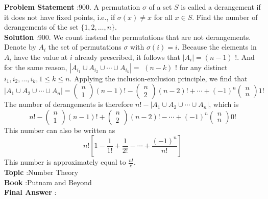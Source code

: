 \documentclass[10pt]{article}
\begin{document}
\textbf{Problem Statement} :900. A permutation $\sigma$ of a set $S$ is called a derangement if it does not have fixed points, i.e., if $\sigma(x) \neq x$ for all $x \in S$. Find the number of derangements of the set $\{1,2, \ldots, n\}$.\\
\textbf{Solution} :900. We count instead the permutations that are not derangements. Denote by $A_{i}$ the set of permutations $\sigma$ with $\sigma(i)=i$. Because the elements in $A_{i}$ have the value at $i$ already prescribed, it follows that $\left|A_{i}\right|=(n-1)$ !. And for the same reason, $\left|A_{i_{1}} \cup A_{i_{2}} \cup \cdots \cup A_{i_{k}}\right|=$ $(n-k)$ ! for any distinct $i_{1}, i_{2}, \ldots, i_{k}, 1 \leq k \leq n$. Applying the inclusion-exclusion principle, we find that $$ \left|A_{1} \cup A_{2} \cup \cdots \cup A_{n}\right|=\left(\begin{array}{l} n \\ 1 \end{array}\right)(n-1) !-\left(\begin{array}{l} n \\ 2 \end{array}\right)(n-2) !+\cdots+(-1)^{n}\left(\begin{array}{l} n \\ n \end{array}\right) 1 ! $$The number of derangements is therefore $n !-\left|A_{1} \cup A_{2} \cup \cdots \cup A_{n}\right|$, which is$$ n !-\left(\begin{array}{l} n \\ 1 \end{array}\right)(n-1) !+\left(\begin{array}{l} n \\ 2 \end{array}\right)(n-2) !-\cdots+(-1)^{n}\left(\begin{array}{l} n \\ n \end{array}\right) 0 ! $$This number can also be written as$$ n !\left[1-\frac{1}{1 !}+\frac{1}{2 !}-\cdots+\frac{(-1)^{n}}{n !}\right] $$This number is approximately equal to $\frac{n !}{e}$.\\
\textbf{Topic} :Number Theory\\
\textbf{Book} :Putnam and Beyond\\
\textbf{Final Answer} :\\
\end{document}
